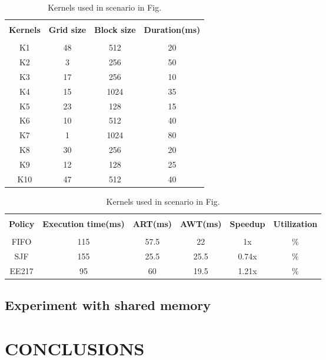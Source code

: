 \documentclass[12pt,journal,compsoc]{IEEEtran}
\begin{document}
\begin{table}[ht]
   \caption{Kernels used in scenario in Fig. } %
   \centering
   \begin{tabular}{|c|c|c|c|}
   \hline\\
   \bf Kernels & \bf Grid size & \bf Block size & \bf Duration(ms)\\
   \hline\\
   K1 & 48 & 512 & 20 \\
   K2 & 3 & 256 & 50\\ 
   K3 & 17 & 256 & 10 \\
   K4 & 15 & 1024 & 35 \\
   K5 & 23 & 128 & 15 \\ 
   K6 & 10 & 512 & 40 \\
   K7 & 1 & 1024 & 80 \\
   K8 & 30 & 256 & 20\\ 
   K9 & 12 & 128 & 25 \\
   K10 & 47 & 512 & 40 \\
   \hline
   \end{tabular}
   \label{table:scenario2_kernel}
\end{table}

\begin{table*}[ht]
   \caption{Kernels used in scenario in Fig. } %
   \centering
   \begin{tabular}{|c|c|c|c|c|c|}
   \hline\\
   \bf Policy & \bf Execution time(ms)& \bf ART(ms) & \bf AWT(ms) & \bf Speedup & \bf Utilization \\
   \hline\\
   FIFO & 115 & 57.5 & 22 & 1x & $\%$ \\
   SJF & 155 & 25.5 & 25.5 & 0.74x & $\%$ \\ 
   EE217 & 95 & 60 & 19.5 & 1.21x & $\%$ \\
   \hline
   \end{tabular}
   \label{table:scenario1_result}
\end{table*}

\subsection{Experiment with shared memory}




\section{CONCLUSIONS}
\end{document}
